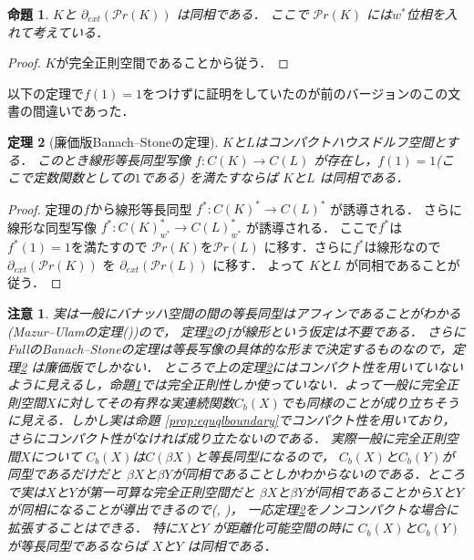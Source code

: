 \documentclass[leqno, a4paper, 12pt]{jsarticle}
\newtheorem{thm}{定理}
\newtheorem{prop}[thm]{命題}
\newtheorem*{rmk}{注意}
\newcommand{\myextreme}[1]{\partial_{ext}(#1)}
\newcommand{\myprob}[1]{\mathcal{P}r(#1)}
\begin{document}
\begin{prop}\label{prop:homeoboundary}
$K$と
$\myextreme{\myprob{K}}$
は同相である．
ここで
$\myprob{K}$
には$w^{*}$位相を入れて考えている．
\end{prop}
\begin{proof}
$K$が完全正則空間であることから従う．
\end{proof}





以下の定理で$f(1)=1$をつけずに証明をしていたのが前のバージョンのこの文書の間違いであった．
\begin{thm}[廉価版Banach--Stoneの定理]\label{thm:main0}
$K$と$L$はコンパクトハウスドルフ空間とする．
このとき線形等長同型写像
$f\colon C(K)\to C(L)$
が存在し，$f(1)=1$(ここで定数関数としての$1$である)
を満たすならば
$K$と$L$
は同相である．
\end{thm}
\begin{proof}
定理の$fから$線形等長同型
$f^{*}\colon C(K)^{*}\to C(L)^{*}$
が誘導される．
さらに線形な同型写像
$f^{*}\colon C(K)^{*}_{w^{*}}\to C(L)^{*}_{w^{*}}$
が誘導される．
ここで$f^{*}$は
$f^{*}(1)=1$を満たすので
$\myprob{K}$を$\myprob{L}$
に移す．さらに$f^{*}$は線形なので
$\myextreme{\myprob{K}}$
を
$\myextreme{\myprob{L}}$
に移す．
よって
$K$と$L$
が同相であることが従う．
\end{proof}

\begin{rmk}
実は一般にバナッハ空間の間の等長同型はアフィンであることがわかる(Mazur--Ulamの定理(\cite{nica}\cite{vai}))ので，
定理\ref{thm:main0}の$f$が線形という仮定は不要である．
さらにFullのBanach--Stoneの定理は等長写像の具体的な形まで決定するものなので，定理\ref{thm:main0}
は廉価版でしかない．
ところで上の定理\ref{thm:main0}にはコンパクト性を用いていないように見えるし，命題\ref{prop:homeoboundary}では完全正則性しか使っていない．よって一般に完全正則空間$X$に対してその有界な実連続関数$C_{b}(X)$でも同様のことが成り立ちそうに見える．しかし実は命題
\ref{prop:equqlboundary}でコンパクト性を用いており，さらにコンパクト性がなければ成り立たないのである．
実際一般に完全正則空間$X$について
$C_{b}(X)$は$C(\beta X)$と等長同型になるので，
$C_{b}(X)$と$C_{b}(Y)$が同型であるだけだと
$\beta X$と$\beta Y$が同相であることしかわからないのである．ところで実は$X$と$Y$が第一可算な完全正則空間だと
$\beta X$と$\beta Y$が同相であることから$X$と$Y$
が同相になることが導出できるので(\cite[p.273]{rings}, \cite[21.5系, 116ページ]{kodamanagami})，
一応定理\ref{thm:main0}をノンコンパクトな場合に拡張することはできる．
特に$X$と$Y$
が距離化可能空間の時に
$C_{b}(X)$と$C_{b}(Y)$
が等長同型であるならば
$X$と$Y$
は同相である．
\end{rmk}
\end{document}
